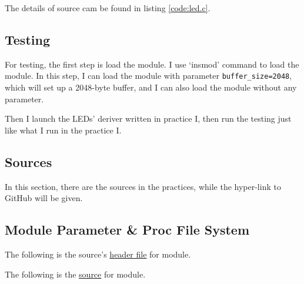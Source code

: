 \documentclass{report}
\begin{document}
    The details of source cam be found in listing \ref{code:led.c}.
    
    \section{Testing}
    \label{chap:mpnpsf:test}
    
    For testing, the first step is load the module. I use `insmod' command to load the module.
    In this step, I can load the module with parameter \lstinline|buffer_size=2048|, 
    which will set up a 2048-byte buffer, and I can also load the module without any parameter.
    
    Then I launch the LEDs' deriver written in practice I, then run the testing just like
    what I run in the practice I.   
        
    \begin{appendix}
        \chapter{Sources}
        \label{achap:source}
        
        In this section, there are the sources in the practices, while the hyper-link to GitHub will be given.
        
        \section{Module Parameter \& Proc File System}
        \label{src:mpnpsf}
        
        The following is the source's \href{https://github.com/Qinka/embedded-system-design-homework/blob/master/practice2/led.h}{header file} for module.
        
        
        The following is the \href{https://github.com/Qinka/embedded-system-design-homework/blob/master/practice2/led.c}{source}
        for module.
        
        
        
    \end{appendix}
    
\end{document}
